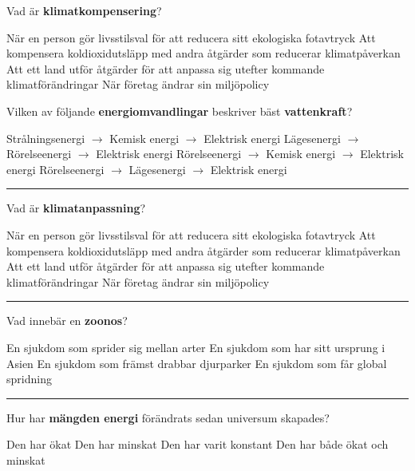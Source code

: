 \documentclass{exam}
\begin{document}
\begin{questions}
\question Vad är \textbf{klimatkompensering}?
\begin{checkboxes}
   \choice När en person gör livsstilsval för att reducera sitt ekologiska fotavtryck
   \correctchoice Att kompensera koldioxidutsläpp med andra åtgärder som reducerar klimatpåverkan
   \choice Att ett land utför åtgärder för att anpassa sig utefter kommande klimatförändringar
   \choice När företag ändrar sin miljöpolicy
\end{checkboxes}

\break
\question Vilken av följande \textbf{energiomvandlingar} beskriver bäst \textbf{vattenkraft}?
\begin{checkboxes}
   \choice Strålningsenergi $\to$ Kemisk energi $\to$ Elektrisk energi
   \correctchoice Lägesenergi $\to$ Rörelseenergi $\to$ Elektrisk energi
   \choice Rörelseenergi $\to$ Kemisk energi $\to$ Elektrisk energi
   \choice Rörelseenergi $\to$ Lägesenergi $\to$ Elektrisk energi
\end{checkboxes}

\vspace{5mm} 
\hrule 
\vspace{5mm} 

\question Vad är \textbf{klimatanpassning}?
\begin{checkboxes}
   \choice När en person gör livsstilsval för att reducera sitt ekologiska fotavtryck
   \choice Att kompensera koldioxidutsläpp med andra åtgärder som reducerar klimatpåverkan
   \correctchoice Att ett land utför åtgärder för att anpassa sig utefter kommande klimatförändringar
   \choice När företag ändrar sin miljöpolicy
\end{checkboxes}

\vspace{5mm} 
\hrule 
\vspace{5mm} 

\question Vad innebär en \textbf{zoonos}?
\begin{checkboxes}
   \correctchoice En sjukdom som sprider sig mellan arter
   \choice En sjukdom som har sitt ursprung i Asien
   \choice En sjukdom som främst drabbar djurparker
   \choice En sjukdom som får global spridning
\end{checkboxes}

\vspace{5mm} 
\hrule 
\vspace{5mm} 

\question Hur har \textbf{mängden energi} förändrats sedan universum skapades?
\begin{checkboxes}
   \choice Den har ökat
   \choice Den har minskat
   \correctchoice Den har varit konstant
   \choice Den har både ökat och minskat
\end{checkboxes}


\end{questions}
\end{document}
